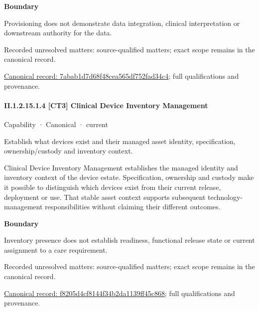 \textbf{Boundary}



Provisioning does not demonstrate data integration, clinical interpretation or downstream authority for the data.


{\small Recorded unresolved matters: source-qualified matters; exact scope remains in the canonical record.}\par
{\footnotesize \href{../../../../continuum/strategy/capability/7abab1d7d68f48cea565df752fad34c4.md}{Canonical record: 7abab1d7d68f48cea565df752fad34c4}; full qualifications and provenance.}\par
\paragraph*{II.1.2.15.1.4 [CT3] Clinical Device Inventory Management}
\label{navigation:II.1.2.15.1.4}

\label{element:f8205d4cf8144f34b2da1139ff45c868}
{\small Capability · Canonical · current}\par

Establish what devices exist and their managed asset identity, specification, ownership/custody and inventory context.



Clinical Device Inventory Management establishes the managed identity and inventory context of the device estate. Specification, ownership and custody make it possible to distinguish which devices exist from their current release, deployment or use. That stable asset context supports subsequent technology-management responsibilities without claiming their different outcomes.



\textbf{Boundary}



Inventory presence does not establish readiness, functional release state or current assignment to a care requirement.


{\small Recorded unresolved matters: source-qualified matters; exact scope remains in the canonical record.}\par
{\footnotesize \href{../../../../continuum/strategy/capability/f8205d4cf8144f34b2da1139ff45c868.md}{Canonical record: f8205d4cf8144f34b2da1139ff45c868}; full qualifications and provenance.}\par
